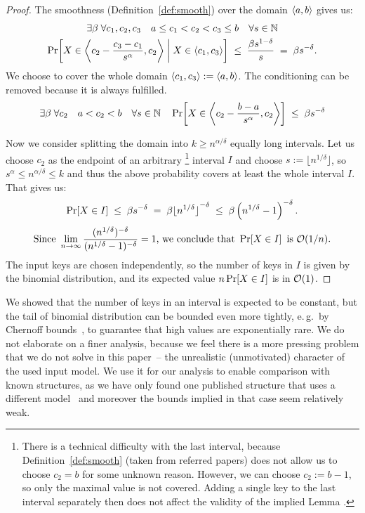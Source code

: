 

\begin{proof}

The smoothness (Definition~\ref{def:smooth}) over the domain $\left\langle a,b\right\rangle$ gives us:
\begin{multline*}
	\exists\beta \; \forall c_1,c_2,c_3 \quad a \le c_1 < c_2 < c_3 \le b \quad \forall s \in \mathbb{N} \\
		\Pr\!\left[  X \in \left\langle c_2 - \frac{c_3-c_1}{s^\alpha} ,c_2\right\rangle \; \middle| \; X \in \left\langle c_1,c_3\right\rangle  \right]
		\;\le\; \frac{\beta s^{1-\delta}}{s}  \;=\;  \beta s^{-\delta}.
\end{multline*}
We choose to cover the whole domain $\left\langle c_1,c_3\right\rangle := \left\langle a,b\right\rangle$. The conditioning can be removed because it is always fulfilled.
\[
	\exists\beta \; \forall c_2 \quad a < c_2 < b \quad \forall s \in \mathbb{N} \quad
		\Pr\!\left[  X \in \left\langle c_2 - \frac{b-a}{s^\alpha} ,c_2\right\rangle  \right]
		\;\le\; \beta s^{-\delta}
\]

Now we consider splitting the domain into $k \ge n^{\alpha / \delta}$ equally long intervals.
Let us choose $c_2$ as the endpoint of an arbitrary%
	\footnote{There is a technical difficulty with the last interval, because Definition~\ref{def:smooth} (taken from referred papers) does not allow us to choose $c_2 = b$ for some unknown reason.
	However, we can choose $c_2 := b-1$, so only the maximal value is not covered. Adding a single key to the last interval separately then does not affect the validity of the implied Lemma%
	.
	}
interval $I$ and choose $s:= \lfloor n^{1 / \delta} \rfloor$, so
$ s^\alpha \le n^{\alpha / \delta} \le k $ and thus the above probability covers at least the whole interval $I$. That gives us:
\[	\Pr\!\left[X \in I\right] \;\le\; \beta s^{-\delta}
	\;=\; \beta {\lfloor n^{1 / \delta} \rfloor}^{-\delta}
	\;\le\; \beta \left( n^{1 / \delta} - 1 \right) ^{-\delta}.
\] \[
\text{Since } \lim_{n \to \infty}
	\frac{ ( n^{1 / \delta} ) ^{-\delta} }{ ( n^{1 / \delta} - 1 ) ^{-\delta} }
	= 1 \text{, we conclude that } \Pr\!\left[X \in I\right] \text{ is } \mathcal O(1/n).
\]
%
The input keys are chosen independently, so the number of keys in $I$ is given by the binomial distribution, and its expected value
$n \Pr\!\left[X \in I\right]$ is in $\mathcal O(1)$.
\end{proof}

\begin{rem*}
We showed that the number of keys in an interval is expected to be constant, but the tail of binomial distribution can be bounded even more tightly, e.\,g.~by Chernoff bounds~\cite[chapter~4.1]{randomAlgs}, to guarantee that high values are exponentially rare.
We do not elaborate on a finer analysis, because we feel there is a more pressing problem that we do not solve in this paper~-- the unrealistic (unmotivated) character of the used input model.
We use it for our analysis to enable comparison with known structures, as we have only found one published structure that uses a different model~\cite{DemaineJP04} and moreover the bounds implied in that case seem relatively weak.
\end{rem*}

